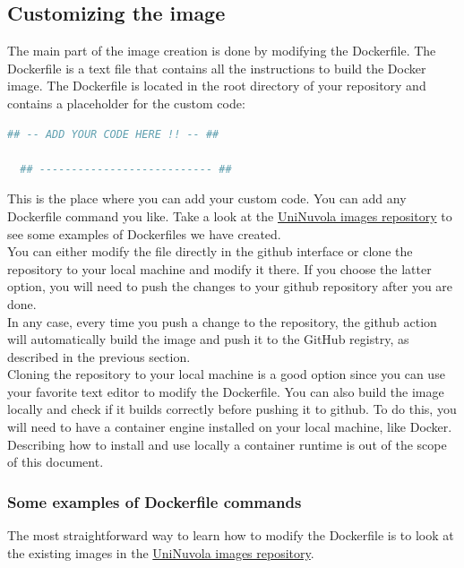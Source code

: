 \subsection{Customizing the image}\label{image_customization}
The main part of the image creation is done by modifying the Dockerfile. The
Dockerfile is a text file that contains all the instructions to build the
Docker image. The Dockerfile is located in the root directory of your
repository and contains a placeholder for the custom code:
\begin{lstlisting}[language=python]
  ## -- ADD YOUR CODE HERE !! -- ##

  ## --------------------------- ##
\end{lstlisting}
This is the place where you can add your custom code. You can add any
Dockerfile command you like. Take a look at the \href{https://github.com/UniNuvola/images}
{UniNuvola images repository} to see some examples of Dockerfiles we have
created. \\
You can either modify the file directly in the github interface or clone the
repository to your local machine and modify it there. If you choose the
latter option, you will need to push the changes to your github repository
after you are done. \\
In any case, every time you push a change to the repository, the github action will
automatically build the image and push it to the GitHub registry, as described in
the previous section. \\
Cloning the repository to your local machine is a good option since you
can use your favorite text editor to modify the Dockerfile. You can also
build the image locally and check if it builds correctly before pushing it to
github. To do this, you will need to have a container engine installed on
your local machine, like Docker. \\
Describing how to install and use locally a container runtime is out of the scope of this document.

\subsubsection{Some examples of Dockerfile commands}

The most straightforward way to learn how to modify the Dockerfile is to
look at the existing images in the \href{https://github.com/UniNuvola/images}
{UniNuvola images repository}.


